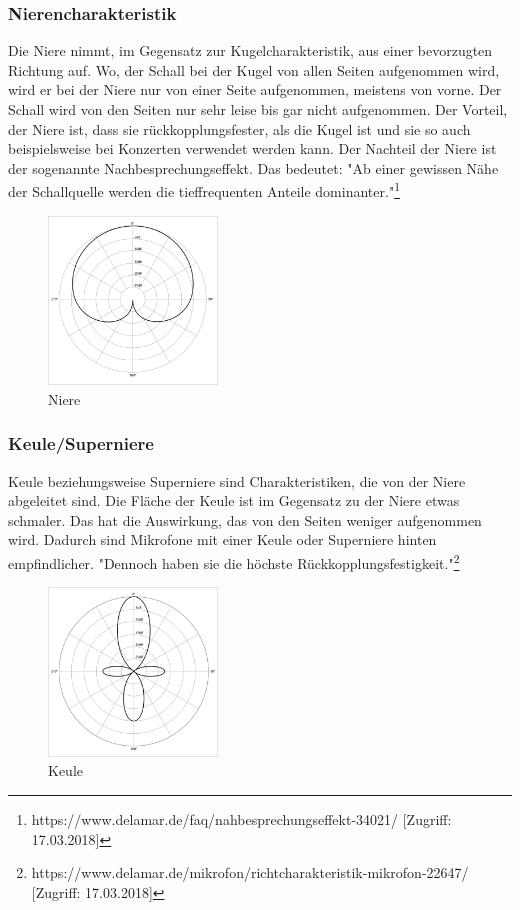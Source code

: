 \subsubsection{Nierencharakteristik}
Die Niere nimmt, im Gegensatz zur Kugelcharakteristik, aus einer bevorzugten Richtung auf. Wo, der Schall bei der Kugel von allen Seiten aufgenommen wird, wird er bei der Niere nur von einer Seite aufgenommen, meistens von vorne. Der Schall wird von den Seiten nur sehr leise bis gar nicht aufgenommen. Der Vorteil, der Niere ist, dass sie rückkopplungsfester, als die Kugel ist und sie so auch beispielsweise bei Konzerten verwendet werden kann. Der Nachteil der Niere ist der sogenannte Nachbesprechungseffekt. Das bedeutet: "Ab einer gewissen Nähe der Schallquelle werden die tieffrequenten Anteile dominanter."\footnote{\label{}https://www.delamar.de/faq/nahbesprechungseffekt-34021/ [Zugriff: 17.03.2018]}
\begin{figure}[H]
	\centering
	\includegraphics[width=0.4\textwidth]{abb5} 
	\caption{Niere}
\end{figure}
\subsubsection{Keule/Superniere}
Keule beziehungsweise Superniere sind Charakteristiken, die von der Niere abgeleitet sind. Die Fläche der Keule ist im Gegensatz zu der Niere etwas schmaler. Das hat die Auswirkung, das von den Seiten weniger aufgenommen wird. Dadurch sind Mikrofone mit einer Keule oder Superniere hinten empfindlicher. "Dennoch haben sie die höchste Rückkopplungsfestigkeit."\footnote{\label{}https://www.delamar.de/mikrofon/richtcharakteristik-mikrofon-22647/ [Zugriff: 17.03.2018]}
\begin{figure}[H]
	\centering
	\includegraphics[width=0.4\textwidth]{abb6} 
	\caption{Keule}
\end{figure}
